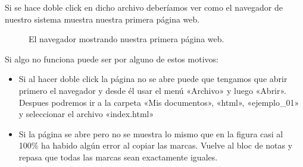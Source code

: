 \documentclass[letterpaper,10pt,spanish]{sphinxmanual}
\begin{document}
Si se hace doble click en dicho archivo deberíamos ver como el navegador de nuestro sistema muestra nuestra primera página web.

\begin{figure}[htbp]
\centering
\capstart

\noindent{}
\caption{El navegador mostrando nuestra primera página web.}\label{\detokenize{index:id7}}\end{figure}

Si algo no funciona puede ser por alguno de estos motivos:
\begin{itemize}
\item {} 
Si al hacer doble click la página no se abre puede que tengamos que abrir primero el navegador y desde él usar el menú «Archivo» y luego «Abrir». Despues podremos ir a la carpeta «Mis documentos», «html», «ejemplo\_01» y seleccionar el archivo «index.html»

\item {} 
Si la página se abre pero no se muestra lo mismo que en la figura casi al 100\% ha habido algún error al copiar las marcas. Vuelve al bloc de notas y repasa que todas las marcas sean exactamente iguales.

\end{itemize}



\renewcommand{\indexname}{Índice}
\printindex
\end{document}
